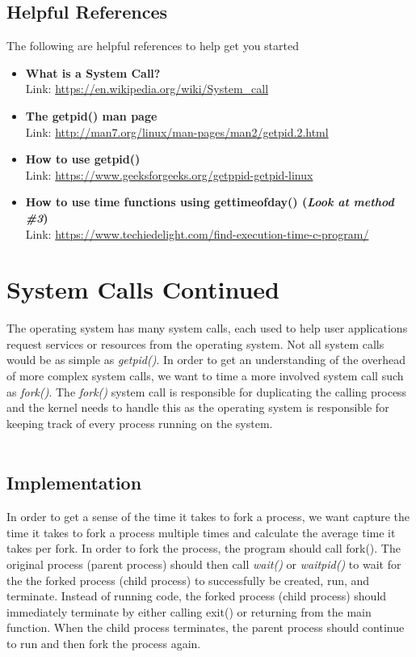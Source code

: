 \documentclass{article}
\begin{document}
\subsection*{Helpful References}
The following are helpful references to help get you started
\begin{itemize}
\item \textbf{What is a System Call?} \\
Link:  \href{https://en.wikipedia.org/wiki/System_call}{https://en.wikipedia.org/wiki/System\_call}
\item \textbf{The getpid() man page} \\
Link:  \href{http://man7.org/linux/man-pages/man2/getpid.2.html}{http://man7.org/linux/man-pages/man2/getpid.2.html}
\item \textbf{How to use getpid()}\\
Link:  \href{https://www.geeksforgeeks.org/getppid-getpid-linux}{https://www.geeksforgeeks.org/getppid-getpid-linux}
\item \textbf{How to use time functions using gettimeofday() (\textit{Look at method \#3})}\\
Link: \href{https://www.techiedelight.com/find-execution-time-c-program/}{https://www.techiedelight.com/find-execution-time-c-program/}
\end{itemize}




\section{System Calls Continued}
The operating system has many system calls, each used to help user applications request services or resources from the operating system.  Not all system calls would be as simple as \textit{getpid()}. In order to get an understanding of the overhead of more complex system calls, we want to time a more involved system call such as \textit{fork()}. The \textit{fork()} system call is responsible for duplicating the calling process and the kernel needs to handle this as the operating system is responsible for keeping track of every process running on the system. \\\\

 
\subsection*{Implementation}
In order to get a sense of the time it takes to fork a process, we want capture the time it takes to fork a process multiple times and calculate the average time it takes per fork. In order to fork the process, the program should call fork(). The original process (parent process) should then call \textit{wait()} or \textit{waitpid()} to wait for the the forked process (child process) to successfully be created, run, and terminate. Instead of running code, the forked process (child process) should immediately terminate by either calling exit() or returning from the main function. When the child process terminates, the parent process should continue to run and then fork the process again. 
\end{document}
